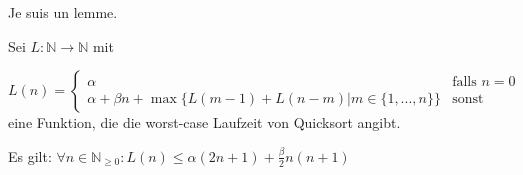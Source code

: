 \documentclass[lang=ngerman, margins=small, extendmath=true]{scrhmwrk}
\begin{document}

\begin{lemma}
  Je suis un lemme.
\end{lemma}

\begin{precondition*}
Sei $L: \mathbb{N} \rightarrow \mathbb{N}$ mit  
\end{precondition*}
\begin{equation*}
  L(n) = 
  \begin{cases}
  \alpha &\text{falls } n=0\\
  \alpha + \beta n + \max\{L(m-1) + L(n-m) | m \in \{1,...,n\}\} & \text{sonst}
  \end{cases}
\end{equation*}
eine Funktion, die die worst-case Laufzeit von Quicksort angibt.

\begin{assertion*}
Es gilt: $\forall n \in \mathbb{N}_{\geq 0}: L(n) \leq \alpha (2n+1) + \frac{\beta}{2} n (n+1)$
\end{assertion*}
\end{document}
